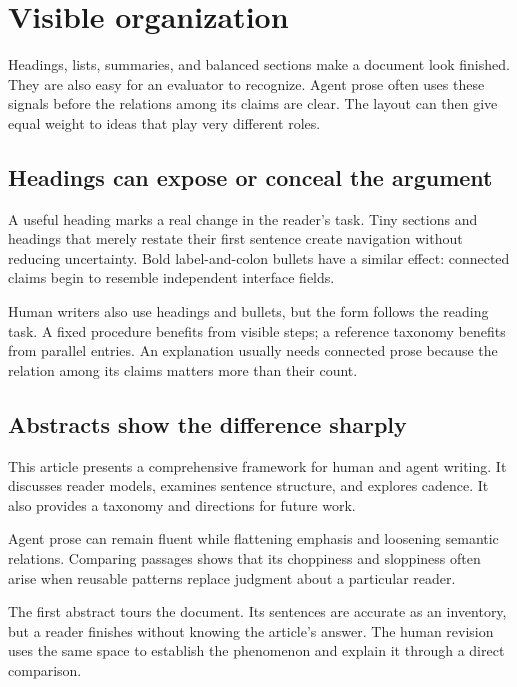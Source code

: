 \section{Visible organization}
\label{sec:structure}

Headings, lists, summaries, and balanced sections make a document look
finished. They are also easy for an evaluator to recognize. Agent prose often
uses these signals before the relations among its claims are clear. The layout
can then give equal weight to ideas that play very different roles.

\subsection{Headings can expose or conceal the argument}

A useful heading marks a real change in the reader's task. Tiny sections and
headings that merely restate their first sentence create navigation without
reducing uncertainty. Bold label-and-colon bullets have a similar effect:
connected claims begin to resemble independent interface fields.

Human writers also use headings and bullets, but the form follows the reading
task. A fixed procedure benefits from visible steps; a reference taxonomy
benefits from parallel entries. An explanation usually needs connected prose
because the relation among its claims matters more than their count.

\subsection{Abstracts show the difference sharply}

\agentdraft

This article presents a comprehensive framework for human and agent writing.
It discusses reader models, examines sentence structure, and explores cadence.
It also provides a taxonomy and directions for future work.

\humanrevision

Agent prose can remain fluent while flattening emphasis and loosening semantic
relations. Comparing passages shows that its choppiness and sloppiness often
arise when reusable patterns replace judgment about a particular reader.

The first abstract tours the document. Its sentences are accurate as an
inventory, but a reader finishes without knowing the article's answer. The
human revision uses the same space to establish the phenomenon and explain it
through a direct comparison.


